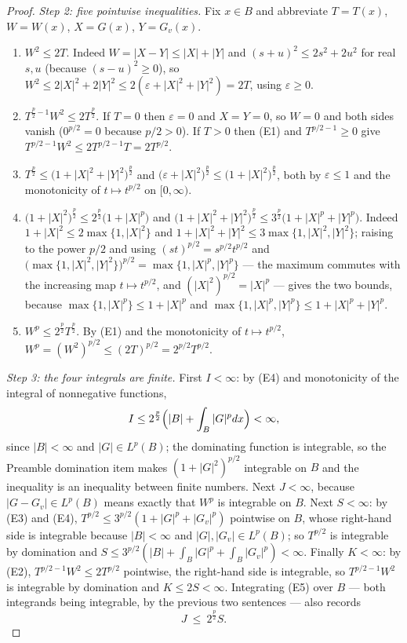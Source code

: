 \begin{proof}
\emph{Step 2: five pointwise inequalities.}  Fix $x\in B$ and abbreviate
$T=T(x)$, $W=W(x)$, $X=G(x)$, $Y=G_v(x)$.
\begin{enumerate}
\item[(E1)] $W^2\le2T$.  Indeed $W=|X-Y|\le|X|+|Y|$ and
  $(s+u)^2\le2s^2+2u^2$ for real $s,u$ (because $(s-u)^2\ge0$), so
  $W^2\le2|X|^2+2|Y|^2\le2(\varepsilon+|X|^2+|Y|^2)=2T$, using
  $\varepsilon\ge0$.
\item[(E2)] $T^{\frac p2-1}W^2\le2T^{\frac p2}$.  If $T=0$ then
  $\varepsilon=0$ and $X=Y=0$, so $W=0$ and both sides vanish ($0^{p/2}=0$
  because $p/2>0$).  If $T>0$ then (E1) and $T^{p/2-1}\ge0$ give
  $T^{p/2-1}W^2\le2T^{p/2-1}T=2T^{p/2}$.
\item[(E3)] $T^{\frac p2}\le\bigl(1+|X|^2+|Y|^2\bigr)^{\frac p2}$ and
  $\bigl(\varepsilon+|X|^2\bigr)^{\frac p2}\le\bigl(1+|X|^2\bigr)^{\frac p2}$,
  both by $\varepsilon\le1$ and the monotonicity of $t\mapsto t^{p/2}$ on
  $[0,\infty)$.
\item[(E4)] $\bigl(1+|X|^2\bigr)^{\frac p2}\le2^{\frac p2}\bigl(1+|X|^{p}\bigr)$
  and
  $\bigl(1+|X|^2+|Y|^2\bigr)^{\frac p2}
  \le3^{\frac p2}\bigl(1+|X|^{p}+|Y|^{p}\bigr)$.
  Indeed $1+|X|^2\le2\max\{1,|X|^2\}$ and
  $1+|X|^2+|Y|^2\le3\max\{1,|X|^2,|Y|^2\}$; raising to the power $p/2$ and using
  $(st)^{p/2}=s^{p/2}t^{p/2}$ and
  $\bigl(\max\{1,|X|^2,|Y|^2\}\bigr)^{p/2}=\max\{1,|X|^{p},|Y|^{p}\}$ --- the
  maximum commutes with the increasing map $t\mapsto t^{p/2}$, and
  $(|X|^2)^{p/2}=|X|^{p}$ --- gives the two bounds, because
  $\max\{1,|X|^p\}\le1+|X|^p$ and $\max\{1,|X|^p,|Y|^p\}\le1+|X|^p+|Y|^p$.
\item[(E5)] $W^p\le2^{\frac p2}T^{\frac p2}$.  By (E1) and the monotonicity of
  $t\mapsto t^{p/2}$, $W^p=(W^2)^{p/2}\le(2T)^{p/2}=2^{p/2}T^{p/2}$.
\end{enumerate}

\emph{Step 3: the four integrals are finite.}  First $I<\infty$: by (E4) and
monotonicity of the integral of nonnegative functions,
\[
I\le2^{\frac p2}\Bigl(|B|+\int_B|G|^{p}dx\Bigr)<\infty ,
\]
since $|B|<\infty$ and $|G|\in L^p(B)$; the dominating function is integrable,
so the Preamble domination item makes $(1+|G|^2)^{p/2}$ integrable on $B$ and
the inequality is an inequality between finite numbers.  Next $J<\infty$,
because $|G-G_v|\in L^p(B)$ means exactly that $W^p$ is integrable on $B$.
Next $S<\infty$: by (E3) and (E4),
$T^{p/2}\le3^{p/2}(1+|G|^{p}+|G_v|^{p})$ pointwise on $B$, whose right-hand side
is integrable because $|B|<\infty$ and $|G|,|G_v|\in L^p(B)$; so $T^{p/2}$ is
integrable by domination and
$S\le3^{p/2}(|B|+\int_B|G|^p+\int_B|G_v|^p)<\infty$.  Finally $K<\infty$: by
(E2), $T^{p/2-1}W^2\le2T^{p/2}$ pointwise, the right-hand side is integrable, so
$T^{p/2-1}W^2$ is integrable by domination and $K\le2S<\infty$.  Integrating
(E5) over $B$ --- both integrands being integrable, by the previous two
sentences --- also records
\[
J\ \le\ 2^{\frac p2}S .
\tag{1}
\]


\end{proof}
